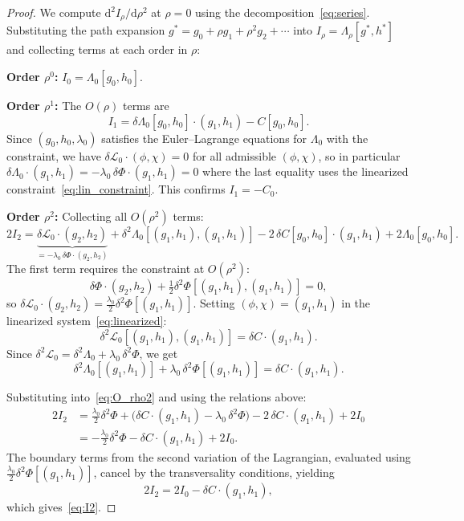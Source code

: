 \documentclass[11pt]{article}
\theoremstyle{definition}
\newcommand{\dd}{\mathrm{d}}
\begin{document}
\begin{proof}
We compute $\dd^2 I_\rho/\dd\rho^2$ at $\rho = 0$ using the decomposition~\eqref{eq:series}. Substituting the path expansion $g^* = g_0 + \rho g_1 + \rho^2 g_2 + \cdots$ into $I_\rho = \Lambda_\rho[g^*, h^*]$ and collecting terms at each order in $\rho$:

\medskip\noindent\textbf{Order $\rho^0$:} $I_0 = \Lambda_0[g_0, h_0]$.

\medskip\noindent\textbf{Order $\rho^1$:} The $O(\rho)$ terms are
\begin{equation}
  I_1 = \delta\Lambda_0[g_0,h_0]\cdot(g_1,h_1) - C[g_0,h_0].
\end{equation}
Since $(g_0, h_0, \lambda_0)$ satisfies the Euler--Lagrange equations for $\Lambda_0$ with the constraint, we have $\delta\mathcal{L}_0\cdot(\phi,\chi) = 0$ for all admissible $(\phi,\chi)$, so in particular $\delta\Lambda_0\cdot(g_1,h_1) = -\lambda_0\,\delta\Phi\cdot(g_1,h_1) = 0$ where the last equality uses the linearized constraint~\eqref{eq:lin_constraint}. This confirms $I_1 = -C_0$.

\medskip\noindent\textbf{Order $\rho^2$:} Collecting all $O(\rho^2)$ terms:
\begin{equation}\label{eq:O_rho2}
  2I_2 = \underbrace{\delta\mathcal{L}_0\cdot(g_2,h_2)}_{= -\lambda_0\,\delta\Phi\cdot(g_2,h_2)} + \delta^2\Lambda_0[(g_1,h_1),(g_1,h_1)] - 2\,\delta C[g_0,h_0]\cdot(g_1,h_1) + 2\Lambda_0[g_0,h_0].
\end{equation}
The first term requires the constraint at $O(\rho^2)$:
\begin{equation}
  \delta\Phi\cdot(g_2,h_2) + \tfrac{1}{2}\delta^2\Phi[(g_1,h_1),(g_1,h_1)] = 0,
\end{equation}
so $\delta\mathcal{L}_0\cdot(g_2,h_2) = \frac{\lambda_0}{2}\delta^2\Phi[(g_1,h_1)]$. Setting $(\phi,\chi) = (g_1,h_1)$ in the linearized system~\eqref{eq:linearized}:
\begin{equation}
  \delta^2\mathcal{L}_0[(g_1,h_1),(g_1,h_1)] = \delta C\cdot(g_1,h_1).
\end{equation}
Since $\delta^2\mathcal{L}_0 = \delta^2\Lambda_0 + \lambda_0\,\delta^2\Phi$, we get
\begin{equation}
  \delta^2\Lambda_0[(g_1,h_1)] + \lambda_0\,\delta^2\Phi[(g_1,h_1)] = \delta C\cdot(g_1,h_1).
\end{equation}

Substituting into~\eqref{eq:O_rho2} and using the relations above:
\begin{align}
  2I_2 &= \tfrac{\lambda_0}{2}\delta^2\Phi + \bigl(\delta C\cdot(g_1,h_1) - \lambda_0\,\delta^2\Phi\bigr) - 2\,\delta C\cdot(g_1,h_1) + 2I_0 \\
  &= -\tfrac{\lambda_0}{2}\delta^2\Phi - \delta C\cdot(g_1,h_1) + 2I_0.
\end{align}
The boundary terms from the second variation of the Lagrangian, evaluated using $\frac{\lambda_0}{2}\delta^2\Phi[(g_1,h_1)]$, cancel by the transversality conditions, yielding
\begin{equation}
  2I_2 = 2I_0 - \delta C\cdot(g_1,h_1),
\end{equation}
which gives~\eqref{eq:I2}.
\end{proof}
\end{document}
